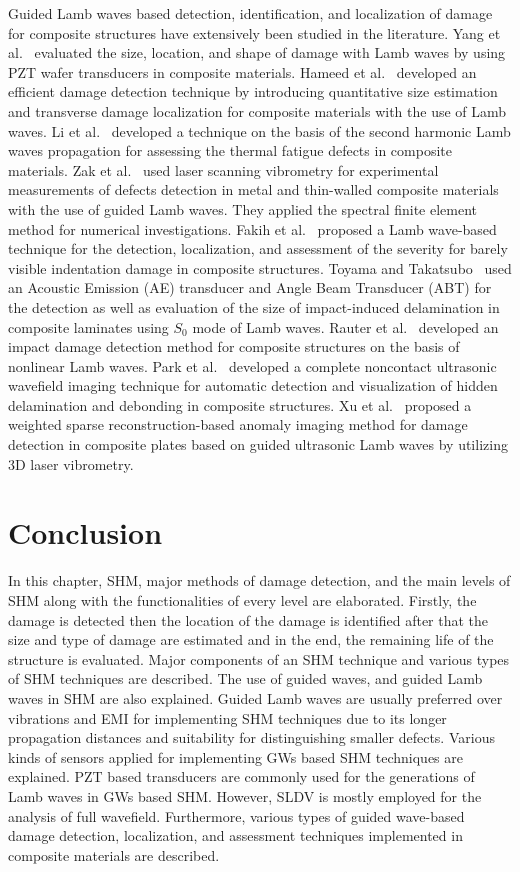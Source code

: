 \documentclass[b5paper, 11pt, titlepage]{book}
\begin{document}
Guided Lamb waves based detection, identification, and localization of damage for composite structures have extensively been studied in the literature. Yang et al.~\cite{Yang2019} evaluated the size, location, and shape of damage with Lamb waves by using PZT wafer transducers in composite materials. Hameed et al.~\cite{Hameed2019b} developed an efficient damage detection technique by introducing quantitative size estimation and transverse damage localization for composite materials with the use of Lamb waves. Li et al.~\cite{Li2012} developed a technique on the basis of the second harmonic Lamb waves propagation for assessing the thermal fatigue defects in composite materials. Zak et al.~\cite{Zak2012} used laser scanning vibrometry for experimental measurements of defects detection in metal and thin-walled composite materials with the use of guided Lamb waves. They applied the spectral finite element method for numerical investigations. Fakih et al.~\cite{Fakih2019} proposed a Lamb wave-based technique for the detection, localization, and assessment of the severity for barely visible indentation damage in composite structures. Toyama and Takatsubo~\cite{Toyama2004} used an Acoustic Emission (AE) transducer and Angle Beam Transducer (ABT) for the detection as well as evaluation of the size of impact-induced delamination in composite laminates using $S_0$ mode of Lamb waves. Rauter et al.~\cite{Rauter2015} developed an impact damage detection method for composite structures on the basis of nonlinear Lamb waves. Park et al.~\cite{Park2014} developed a complete noncontact ultrasonic wavefield imaging technique for automatic detection and visualization of hidden delamination and debonding in composite structures. Xu et al.~\cite{Staszewski2009} proposed a weighted sparse reconstruction-based anomaly imaging method for damage detection in composite plates based on guided ultrasonic Lamb waves by utilizing 3D laser vibrometry. 

\section{Conclusion}
In this chapter, SHM, major methods of damage detection, and the main levels of SHM along with the functionalities of every level are elaborated. Firstly, the damage is detected then the location of the damage is identified after that the size and type of damage are estimated and in the end, the remaining life of the structure is evaluated. Major components of an SHM technique and various types of SHM techniques are described. The use of guided waves, and guided Lamb waves in SHM are also explained. Guided Lamb waves are usually preferred over vibrations and EMI for implementing SHM techniques due to its longer propagation distances and suitability for distinguishing smaller defects. Various kinds of sensors applied for implementing GWs based SHM techniques are explained. PZT based transducers are commonly used for the generations of Lamb waves in GWs based SHM. However, SLDV is mostly employed for the analysis of full wavefield. Furthermore, various types of guided wave-based damage detection, localization, and assessment techniques implemented in composite materials are described.
\end{document}
